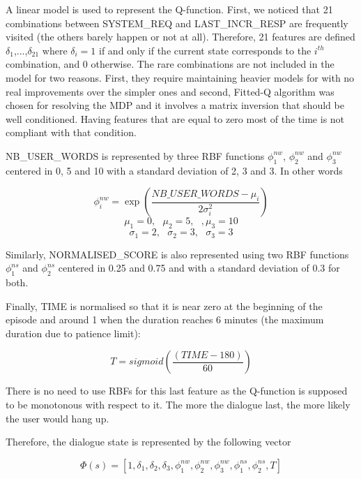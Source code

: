         A linear model is used to represent the Q-function. First, we noticed that 21 combinations between SYSTEM\_REQ and LAST\_INCR\_RESP are frequently visited (the others barely happen or not at all). Therefore, 21 features are defined $\delta_1$,...,$\delta_{21}$ where $\delta_i = 1$ if and only if the current state corresponds to the $i^{th}$ combination, and 0 otherwise. The rare combinations are not included in the model for two reasons. First, they require maintaining heavier models for with no real improvements over the simpler ones and second, Fitted-Q algorithm was chosen for resolving the MDP and it involves a matrix inversion that should be well conditioned. Having features that are equal to zero most of the time is not compliant with that condition.
        
        NB\_USER\_WORDS is represented by three RBF functions $\phi^{nw}_1$, $\phi^{nw}_2$ and $\phi^{nw}_3$ centered in 0, 5 and 10 with a standard deviation of 2, 3 and 3. In other words
        
        	$$ \phi^{nw}_i = \exp (\frac{NB\_USER\_WORDS - \mu_i}{2 \sigma_i^2}) $$
           	$$ \mu_1 = 0, \text{ } \mu_2 = 5, \text{ }, \mu_3 = 10 $$
            $$ \sigma_1 = 2, \text{ } \sigma_2 = 3, \text{ } \sigma_3 = 3 $$
            
      	Similarly, NORMALISED\_SCORE is also represented using two RBF functions $\phi^{ns}_1$ and $\phi^{ns}_2$ centered in 0.25 and 0.75 and with a standard deviation of 0.3 for both.
        
        Finally, TIME is normalised so that it is near zero at the beginning of the episode and around 1 when the duration reaches 6 minutes (the maximum duration due to patience limit):
        
        	$$ T = sigmoid(\frac{(TIME-180)}{60}) $$
            
       	There is no need to use RBFs for this last feature as the Q-function is supposed to be monotonous with respect to it. The more the dialogue last, the more likely the user would hang up.
        
        Therefore, the dialogue state is represented by the following vector
        
        	$$ \Phi(s) = [1,\delta_1,\delta_2,\delta_3,\phi^{nw}_1,\phi^{nw}_2,\phi^{nw}_3,\phi^{ns}_1,\phi^{ns}_2,T] $$
            
